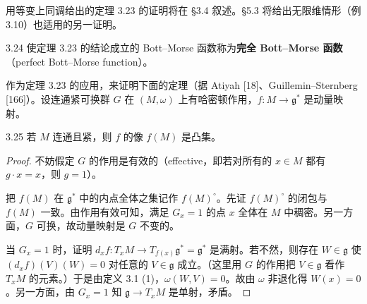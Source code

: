 用等变上同调给出的定理 3.23 的证明将在 §3.4 叙述。§5.3 将给出无限维情形（例 3.10）也适用的另一证明。

\begin{definition}{3.24}
  使定理 3.23 的结论成立的 Bott–Morse 函数称为\textbf{完全 Bott–Morse 函数}（perfect Bott–Morse function）。
\end{definition}

作为定理 3.23 的应用，来证明下面的定理（据 Atiyah [18]、Guillemin–Sternberg [166]）。设连通紧可换群 $G$ 在 $(M,\omega)$ 上有哈密顿作用，$f\colon M\to\mathfrak{g}^*$ 是动量映射。

\begin{theorem*}{3.25}
  若 $M$ 连通且紧，则 $f$ 的像 $f(M)$ 是凸集。
\end{theorem*}

\begin{proof}
  不妨假定 $G$ 的作用是有效的（effective，即若对所有的 $x\in M$ 都有 $g\cdot x=x$，则 $g=1$）。

  把 $f(M)$ 在 $\mathfrak{g}^*$ 中的内点全体之集记作 $f(M)^\circ$。先证 $f(M)^\circ$ 的闭包与 $f(M)$ 一致。由作用有效可知，满足 $G_x=1$ 的点 $x$ 全体在 $M$ 中稠密。另一方面，$G$ 可换，故动量映射是 $G$ 不变的。

  当 $G_x=1$ 时，证明 $d_xf\colon T_xM\to T_{f(x)}\mathfrak{g}^*=\mathfrak{g}^*$ 是满射。若不然，则存在 $W\in\mathfrak{g}$ 使 $(d_xf)(V)(W)=0$ 对任意的 $V\in\mathfrak{g}$ 成立。（这里用 $G$ 的作用把 $V\in\mathfrak{g}$ 看作 $T_xM$ 的元素。）于是由定义 3.1 (1)，$\omega(W,V)=0$。故由 $\omega$ 非退化得 $W(x)=0$。另一方面，由 $G_x=1$ 知 $\mathfrak{g}\to T_xM$ 是单射，矛盾。
\end{proof}

